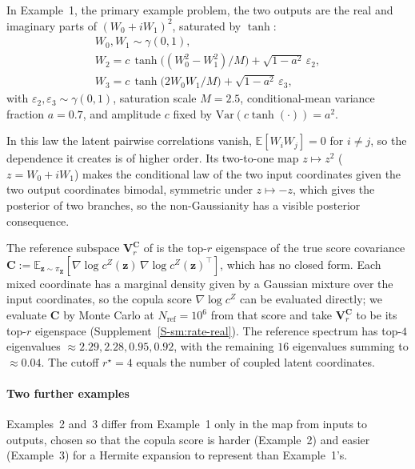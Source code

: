 \documentclass[review,hidelinks,onefignum,onetabnum]{siamart251216}
\newcommand{\EE}{\mathbb{E}}
\newcommand{\Var}{\mathrm{Var}}
\newcommand{\gauss}{\gamma}
\newcommand{\mC}{\bm{C}}
\newcommand{\mV}{\bm{V}}
\newcommand{\vz}{\bm{z}}
\newcommand{\vZ}{\bm{Z}}
\begin{document}
In Example~1, the primary example problem, the two outputs are the real and imaginary parts of $(W_0 + iW_1)^2$, saturated by $\tanh$:
\begin{equation}
\begin{gathered}
  W_0, W_1 \sim \gauss(0, 1), \\
  W_2 = c\,\tanh\!\bigl((W_0^2 - W_1^2)/M\bigr) + \sqrt{1 - a^2}\,\varepsilon_2, \\
  W_3 = c\,\tanh\!\bigl(2 W_0 W_1/M\bigr) + \sqrt{1 - a^2}\,\varepsilon_3,
\end{gathered}
  \label{eq:ex1-block}
\end{equation}
with $\varepsilon_2, \varepsilon_3 \sim \gauss(0,1)$, saturation scale $M = 2.5$, conditional-mean variance fraction $a = 0.7$, and amplitude $c$ fixed by $\Var(c\tanh(\cdot)) = a^2$.

In this law the latent pairwise correlations vanish, $\EE[W_iW_j] = 0$ for $i \ne j$, so the dependence it creates is of higher order. Its two-to-one map $z \mapsto z^2$ ($z = W_0 + iW_1$) makes the conditional law of the two input coordinates given the two output coordinates bimodal, symmetric under $z \mapsto -z$, which gives the posterior of  two branches, so the non-Gaussianity has a visible posterior consequence.

The reference subspace $\mV_r^{\mC}$ of  is the top-$r$ eigenspace of the true score covariance $\mC := \EE_{\vz \sim \pi_{\vZ}}[\nabla \log c^{Z}(\vz)\, \nabla \log c^{Z}(\vz)^\top]$, which has no closed form. Each mixed coordinate has a marginal density given by a Gaussian mixture over the input coordinates, so the copula score $\nabla\log c^{Z}$ can be evaluated directly; we evaluate $\mC$ by Monte Carlo at $N_{\mathrm{ref}} = 10^6$ from that score and take $\mV_r^{\mC}$ to be its top-$r$ eigenspace (Supplement~\ref{S-sm:rate-real}). The reference spectrum has top-$4$ eigenvalues $\approx 2.29, 2.28, 0.95, 0.92$, with the remaining $16$ eigenvalues summing to $\approx 0.04$. The cutoff $r^\star = 4$ equals the number of coupled latent coordinates.

\paragraph{Two further examples} Examples~2 and~3 differ from Example~1 only in the map from inputs to outputs, chosen so that the copula score is harder (Example~2) and easier (Example~3) for a Hermite expansion to represent than Example~1's.
\end{document}
